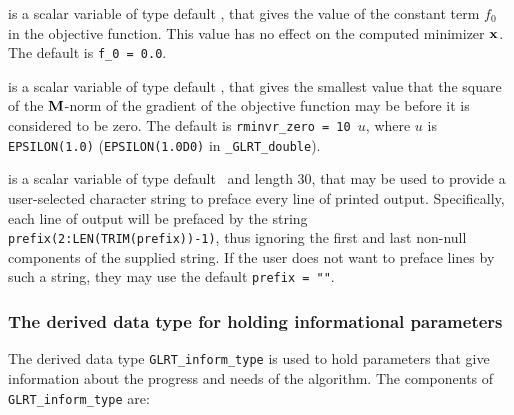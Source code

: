 \documentclass{galahad}
\newcommand{\packagename}{GL\-RT}
\newcommand{\fullpackagename}{\libraryname\_\packagename}
\begin{document}
\begin{description}
 is a scalar variable of type default
\realdp, that gives the value of the constant term $f_0$ in the
objective function. This value has no effect on the
computed minimizer ${\mathbf{x}}$. The default is {\tt f\_0 = 0.0}.

 is a scalar variable of type default
\realdp, that gives the smallest value that the square of the ${\mathbf{M}}$-norm of
the gradient of the objective function may be before it is considered to be
zero.
The default is {\tt rminvr\_zero = 10 $u$},
where $u$ is {\tt EPSILON(1.0)} ({\tt EPSILON(1.0D0)} in
{\tt \fullpackagename\_double}).

 is a scalar variable of type default \character\
and length 30, that may be used to provide a user-selected
character string to preface every line of printed output.
Specifically, each line of output will be prefaced by the string
{\tt prefix(2:LEN(TRIM(prefix))-1)},
thus ignoring the first and last non-null components of the
supplied string. If the user does not want to preface lines by such
a string, they may use the default {\tt prefix = ""}.

\end{description}


\subsubsection{The derived data type for holding informational
 parameters}\label{typeinfo}
The derived data type
{\tt \packagename\_inform\_type}
is used to hold parameters that give information about the progress and needs
of the algorithm. The components of
{\tt \packagename\_inform\_type}
are:
\end{document}
